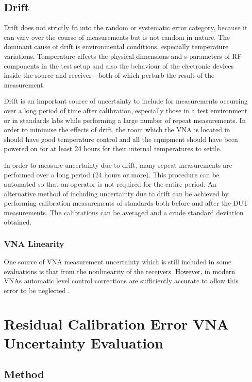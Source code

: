 \documentclass[../thesis/thesis.tex]{subfiles}
\begin{document}
\begin{refsection}
\subsection{Drift}

Drift does not strictly fit into the random or systematic error category, because it can vary over the course of measurements but is not random in nature. The dominant cause of drift is environmental conditions, especially temperature variations. Temperature affects the physical dimensions and s-parameters of RF components in the test setup and also the behaviour of the electronic devices inside the source and receiver - both of which perturb the result of the measurement.

Drift is an important source of uncertainty to include for measurements occurring over a long period of time after calibration, especially those in a test environment or in standards labs while performing a large number of repeat measurements. In order to minimise the effects of drift, the room which the VNA is located in should have good temperature control and all the equipment should have been powered on for at least 24 hours for their internal temperatures to settle.

In order to measure uncertainty due to drift, many repeat measurements are performed over a long period (24 hours or more). This procedure can be automated so that an operator is not required for the entire period. An alternative method of including uncertainty due to drift can be achieved by performing calibration measurements of standards both before and after the DUT measurements. The calibrations can be averaged and a crude standard deviation obtained.

\subsubsection{VNA Linearity}

One source of VNA measurement uncertainty which is still included in some evaluations is that from the nonlinearity of the receivers. However, in modern VNAs automatic level control corrections are sufficiently accurate to allow this error to be neglected \cite{Rytting_2001, Martens_2007}.

\section{Residual Calibration Error VNA Uncertainty Evaluation}
\subsection{Method}

\end{refsection}
\end{document}
